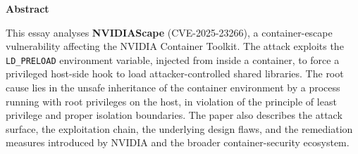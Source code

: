 \thispagestyle{plain}
\begin{center}
  {\large\bfseries Abstract}
\end{center}
\noindent
This essay analyses \textbf{NVIDIAScape} (CVE-2025-23266), a container-escape
vulnerability affecting the NVIDIA Container Toolkit. The attack exploits the
\texttt{LD\_PRELOAD} environment variable, injected from inside a container,
to force a privileged host-side hook to load attacker-controlled
shared libraries. The root cause lies in the unsafe inheritance of the container
environment by a process running with root privileges on the host, in violation of
the principle of least privilege and proper isolation boundaries. The paper also describes the attack surface, the exploitation chain, the underlying design flaws, and the remediation measures introduced by NVIDIA and the broader container-security ecosystem.
